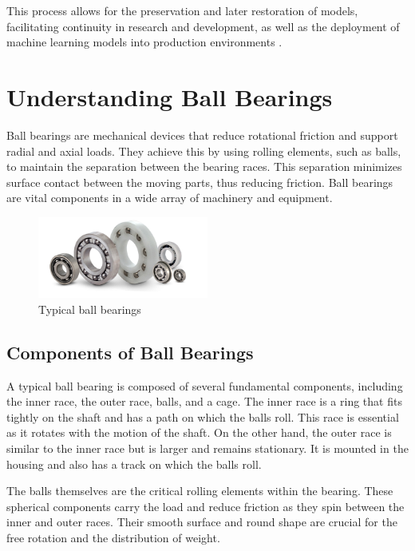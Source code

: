 This process allows for the preservation and later restoration of models, facilitating continuity in research and development, as well as the deployment of machine learning models into production environments \cite[Save, Load and Use Model]{pytorch_tutorial}.


\section{Understanding Ball Bearings}

Ball bearings are mechanical devices that reduce rotational friction and support radial and axial loads. They achieve this by using rolling elements, such as balls, to maintain the separation between the bearing races. This separation minimizes surface contact between the moving parts, thus reducing friction. Ball bearings are vital components in a wide array of machinery and equipment.

\begin{figure}[h]
    \centering
    \includegraphics[width=0.5\textwidth]{assets/ball-bearings.jpg}
    \caption{Typical ball bearings \cite{qbcballbearings}}
    \label{fig:ball_bearing}
\end{figure}

\subsection{Components of Ball Bearings}

A typical ball bearing is composed of several fundamental components, including the inner race, the outer race, balls, and a cage. The inner race is a ring that fits tightly on the shaft and has a path on which the balls roll. This race is essential as it rotates with the motion of the shaft. On the other hand, the outer race is similar to the inner race but is larger and remains stationary. It is mounted in the housing and also has a track on which the balls roll. 

The balls themselves are the critical rolling elements within the bearing. These spherical components carry the load and reduce friction as they spin between the inner and outer races. Their smooth surface and round shape are crucial for the free rotation and the distribution of weight.

